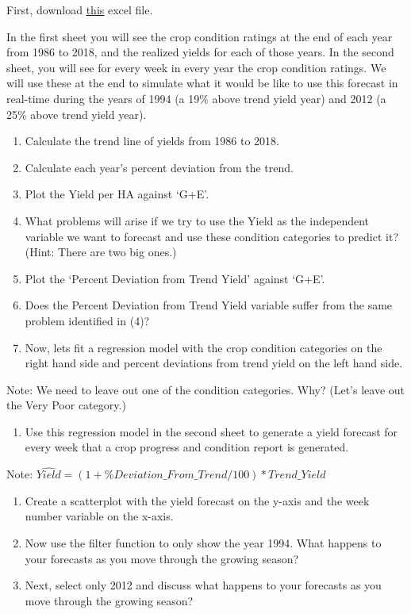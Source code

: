 \documentclass[
  letterpaper,
  DIV=11,
  numbers=noendperiod]{scrreprt}
\providecommand{\tightlist}{%
  \setlength{\itemsep}{0pt}\setlength{\parskip}{0pt}}\usepackage{longtable,booktabs,array}
\begin{document}
First, download \href{Excel-files/yied-forecast-advanced.xlsx}{this}
excel file.

In the first sheet you will see the crop condition ratings at the end of
each year from 1986 to 2018, and the realized yields for each of those
years. In the second sheet, you will see for every week in every year
the crop condition ratings. We will use these at the end to simulate
what it would be like to use this forecast in real-time during the years
of 1994 (a 19\% above trend yield year) and 2012 (a 25\% above trend
yield year).

\begin{enumerate}
\def\labelenumi{\arabic{enumi}.}
\tightlist
\item
  Calculate the trend line of yields from 1986 to 2018.
\item
  Calculate each year's percent deviation from the trend.
\item
  Plot the Yield per HA against `G+E'.
\item
  What problems will arise if we try to use the Yield as the independent
  variable we want to forecast and use these condition categories to
  predict it? (Hint: There are two big ones.)
\item
  Plot the `Percent Deviation from Trend Yield' against `G+E'.
\item
  Does the Percent Deviation from Trend Yield variable suffer from the
  same problem identified in (4)?
\item
  Now, lets fit a regression model with the crop condition categories on
  the right hand side and percent deviations from trend yield on the
  left hand side.
\end{enumerate}

Note: We need to leave out one of the condition categories. Why? (Let's
leave out the Very Poor category.)

\begin{enumerate}
\def\labelenumi{\arabic{enumi}.}
\setcounter{enumi}{7}
\tightlist
\item
  Use this regression model in the second sheet to generate a yield
  forecast for every week that a crop progress and condition report is
  generated.
\end{enumerate}

Note: \(\hat{Yield}=(1+\%Deviation\_From\_Trend/100)*Trend\_Yield\)

\begin{enumerate}
\def\labelenumi{\arabic{enumi}.}
\setcounter{enumi}{8}
\item
  Create a scatterplot with the yield forecast on the y-axis and the
  week number variable on the x-axis.
\item
  Now use the filter function to only show the year 1994. What happens
  to your forecasts as you move through the growing season?
\item
  Next, select only 2012 and discuss what happens to your forecasts as
  you move through the growing season?
\end{enumerate}
\end{document}
